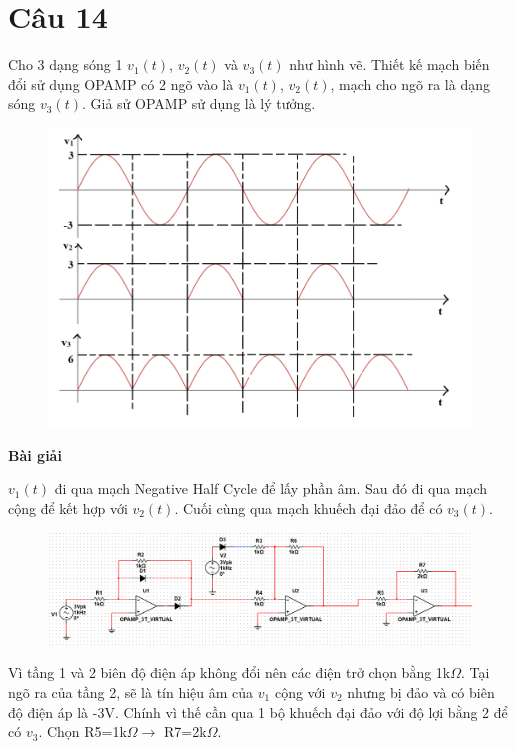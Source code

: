 \section{Câu 14}

Cho 3 dạng sóng 1 $v_1(t)$, $v_2(t)$ và $v_3(t)$ như hình vẽ. Thiết kế mạch biến đổi sử dụng
OPAMP có 2 ngõ vào là $v_1(t)$, $v_2(t)$, mạch cho ngõ ra là dạng sóng $v_3(t)$. Giả sử
OPAMP sử dụng là lý tưởng.
\begin{figure}[H]
	\centering
	\includegraphics[scale=0.9]{image/C14_De.png}
\end{figure}
\begin{center}
\textbf{Bài giải}
\end{center}
$v_1(t)$ đi qua mạch Negative Half Cycle để lấy phần âm. Sau đó đi qua mạch cộng để kết hợp với $v_2(t)$.
Cuối cùng qua mạch khuếch đại đảo để có $v_3(t)$.\\

\begin{figure}[H]
	\centering
	\includegraphics[scale=0.5]{image/C14_BT.png}
\end{figure}

Vì tầng 1 và 2 biên độ điện áp không đổi nên các điện trở chọn bằng 1k$\Omega$.
Tại ngõ ra của tầng 2, sẽ là tín hiệu âm của $v_1$ cộng với $v_2$ nhưng bị đảo và có biên độ điện áp là -3V.
Chính vì thế cần qua 1 bộ khuếch đại đảo với độ lợi bằng 2 để có $v_3$. Chọn R5=1k$\Omega \rightarrow$ R7=2k$\Omega$.

